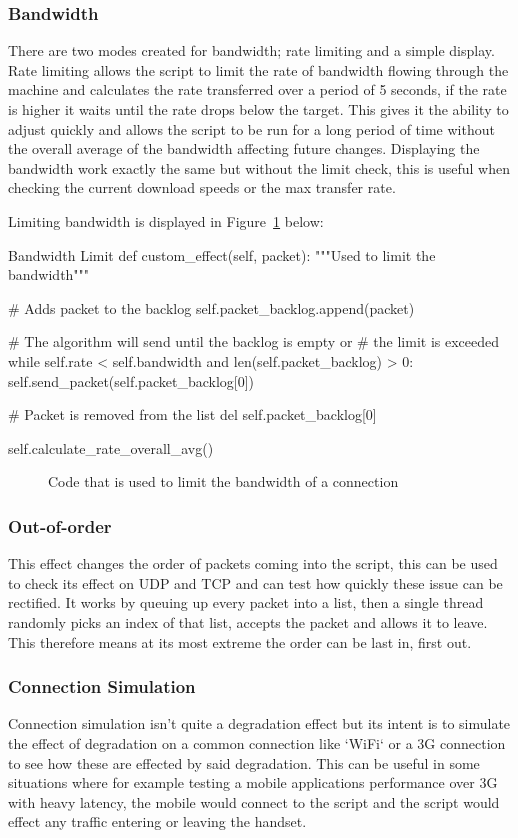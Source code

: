 \subsubsection{Bandwidth}
There are two modes created for bandwidth; rate limiting and a simple display. Rate limiting allows the script to limit the rate of bandwidth flowing through the machine and calculates the rate transferred over a period of 5 seconds, if the rate is higher it waits until the rate drops below the target. This gives it the ability to adjust quickly and allows the script to be run for a long period of time without the overall average of the bandwidth affecting future changes. Displaying the bandwidth work exactly the same but without the limit check, this is useful when checking the current download speeds or the max transfer rate.

Limiting bandwidth is displayed in Figure~\ref{ref:BandwidthCode} below:

\begin{Code}{Bandwidth Limit}
def custom_effect(self, packet):
	"""Used to limit the bandwidth"""

	# Adds packet to the backlog
	self.packet_backlog.append(packet)
	
	# The algorithm will send until the backlog is empty or 
	# the limit is exceeded
	while self.rate < self.bandwidth and len(self.packet_backlog) > 0:
		self.send_packet(self.packet_backlog[0])
            
		# Packet is removed from the list
		del self.packet_backlog[0]
			
		self.calculate_rate_overall_avg()
\end{Code}
\begin{figure}[h]
	\caption{Code that is used to limit the bandwidth of a connection}
	\label{ref:BandwidthCode}
\end{figure}

\subsubsection{Out-of-order}
This effect changes the order of packets coming into the script, this can be used to check its effect on UDP and TCP and can test how quickly these issue can be rectified. It works by queuing up every packet into a list, then a single thread randomly picks an index of that list, accepts the packet and allows it to leave. This therefore means at its most extreme the order can be last in, first out.

\subsubsection{Connection Simulation}
Connection simulation isn't quite a degradation effect but its intent is to simulate the effect of degradation on a common connection like `WiFi` or a 3G connection to see how these are effected by said degradation. This can be useful in some situations where for example testing a mobile applications performance over 3G with heavy latency, the mobile would connect to the script and the script would effect any traffic entering or leaving the handset.

